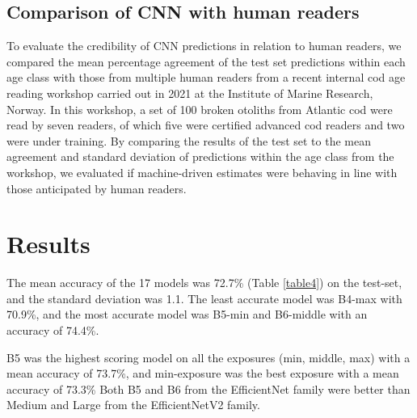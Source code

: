 \documentclass[10pt,letterpaper]{article}
\begin{document}
\subsection{Comparison of CNN with human readers}
To evaluate the credibility of CNN predictions in relation to human readers, we compared the mean percentage agreement of the test set predictions within each age class with those from multiple human readers from a recent internal cod age reading workshop carried out in 2021 at the Institute of Marine Research, Norway. In this workshop, a set of 100 broken otoliths from Atlantic cod were read by seven readers, of which five were certified advanced cod readers and two were under training. By comparing the results of the test set to the mean agreement and standard deviation of predictions within the age class from the workshop, we evaluated if machine-driven estimates were behaving in line with those anticipated by human readers.

\section{Results}

The mean accuracy of the 17 models was 72.7\% (Table \ref{table4}) on the test-set, and 
the standard deviation was 1.1.
The least accurate model was B4-max with 70.9\%, and the most
accurate model was B5-min and B6-middle with an accuracy of 74.4\%.


B5 was the highest scoring model on all the exposures (min, middle, max) with a mean accuracy of 73.7\%,
and min-exposure was the best exposure with a mean accuracy of 73.3\%
Both B5 and B6 from the EfficientNet family were better than 
Medium and Large from the EfficientNetV2 family.
\end{document}
